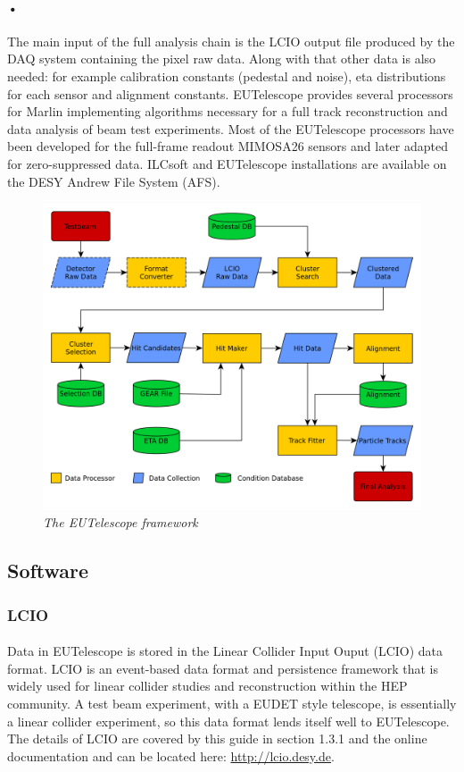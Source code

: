 \documentclass[11pt]{article}
\begin{document}
\paragraph{•}
The main input of the full analysis chain is the LCIO output file produced by the DAQ system containing the pixel raw data. Along with that other data is also needed: for example calibration constants (pedestal and noise), eta distributions for each sensor and alignment constants. EUTelescope provides several processors for Marlin implementing algorithms necessary for a full track reconstruction and data analysis of beam test experiments. Most of the EUTelescope processors have been developed for the full-frame readout MIMOSA26 sensors and later adapted for zero-suppressed data. ILCsoft and EUTelescope installations are available on the DESY Andrew File System (AFS).
\begin{figure}[!ht]
	\centering
	\includegraphics[scale=0.3]{eutel-strategy.png}
	\caption{\textit{The EUTelescope framework}}
\end{figure}
\subsection{Software}
\subsubsection{LCIO}
\paragraph{}
Data in EUTelescope is stored in the Linear Collider Input Ouput (LCIO) data format. LCIO is an event-based data format and persistence framework that is widely used for linear collider studies and reconstruction within the HEP community. A test beam experiment, with a EUDET style telescope, is essentially a linear collider experiment, so this data format lends itself well to EUTelescope. The details of LCIO are covered by this guide in section 1.3.1 and the online documentation and can be located here: \url{http://lcio.desy.de}.
\end{document}

